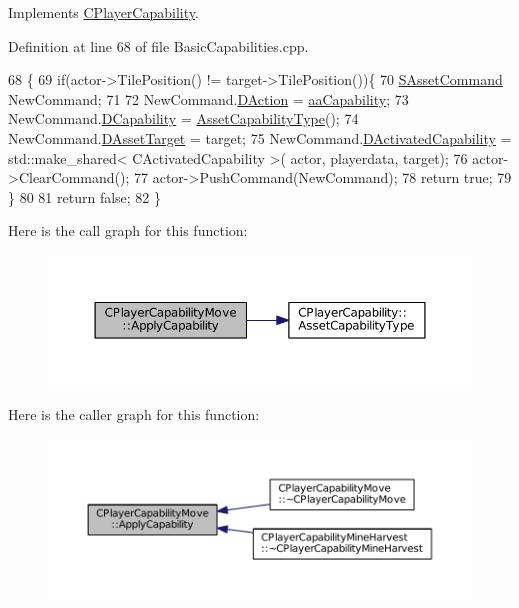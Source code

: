 Implements \hyperlink{classCPlayerCapability_a2ca6fd7fbd9c0178f1cf1d049c63825f}{C\+Player\+Capability}.



Definition at line 68 of file Basic\+Capabilities.\+cpp.


\begin{DoxyCode}
68                                                                                                            
                                                        \{
69     \textcolor{keywordflow}{if}(actor->TilePosition() != target->TilePosition())\{
70         \hyperlink{structSAssetCommand}{SAssetCommand} NewCommand;
71         
72         NewCommand.\hyperlink{structSAssetCommand_a8edd3b3d59a76d5514ba403bc8076a75}{DAction} = \hyperlink{GameDataTypes_8h_ab47668e651a3032cfb9c40ea2d60d670acf9fb164e8abd71c71f4a8c7fda360d4}{aaCapability};
73         NewCommand.\hyperlink{structSAssetCommand_a734ea7c6847457b437360f333f570ff9}{DCapability} = \hyperlink{classCPlayerCapability_a433bb196cd6ab6a932f1cac102b3aa98}{AssetCapabilityType}();
74         NewCommand.\hyperlink{structSAssetCommand_a3d9b43f6e59c386c48c41a65448a0c39}{DAssetTarget} = target;
75         NewCommand.\hyperlink{structSAssetCommand_ad8beda19520811cc70fe1eab16c774dd}{DActivatedCapability} = std::make\_shared< CActivatedCapability >(
      actor, playerdata, target);
76         actor->ClearCommand();
77         actor->PushCommand(NewCommand);
78         \textcolor{keywordflow}{return} \textcolor{keyword}{true};
79     \}
80 
81     \textcolor{keywordflow}{return} \textcolor{keyword}{false};
82 \}
\end{DoxyCode}
Here is the call graph for this function\+:\nopagebreak
\begin{figure}[H]
\begin{center}
\leavevmode
\includegraphics[width=350pt]{classCPlayerCapabilityMove_ade3f4e72612cbf2ad73a6c2e6aa843df_cgraph}
\end{center}
\end{figure}
Here is the caller graph for this function\+:\nopagebreak
\begin{figure}[H]
\begin{center}
\leavevmode
\includegraphics[width=350pt]{classCPlayerCapabilityMove_ade3f4e72612cbf2ad73a6c2e6aa843df_icgraph}
\end{center}
\end{figure}
